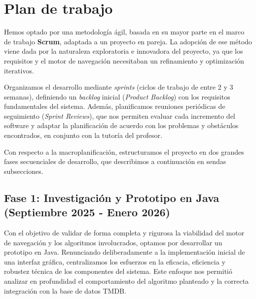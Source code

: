 \section{Plan de trabajo}
Hemos optado por una metodología ágil, basada en su mayor parte en el marco de trabajo \textbf{Scrum}, adaptada a un 
proyecto en pareja. La adopción de ese método viene dada por la naturaleza exploratoria e innovadora del proyecto,
ya que los requisitos y el motor de navegación necesitaban un refinamiento y optimización iterativos.

Organizamos el desarrollo mediante \textit{sprints} (ciclos de trabajo de entre 2 y 3 semanas), definiendo un
\textit{backlog} inicial (\textit{Product Backlog}) con los requisitos fundamentales del sistema. Además, planificamos reuniones
periódicas de seguimiento (\textit{Sprint Reviews}), que nos permiten evaluar cada incremento del software y adaptar la
planificación de acuerdo con los problemas y obstáculos encontrados, en conjunto con la tutoría del profesor.

Con respecto a la macroplanificación, estructuramos el proyecto en dos grandes fases secuenciales de desarrollo,
que describimos a continuación en sendas subsecciones.

\subsection{Fase 1: Investigación y Prototipo en Java (Septiembre 2025 - Enero 2026)}
Con el objetivo de validar de forma completa y rigurosa la viabilidad del motor de navegación y los algoritmos involucrados,
optamos por desarrollar un prototipo en Java. Renunciando deliberadamente a la implementación inicial de una interfaz gráfica,
centralizamos los esfuerzos en la eficacia, eficiencia y robustez técnica de los componentes del sistema.
Este enfoque nos permitió analizar en profundidad el comportamiento del algoritmo planteado y la correcta integración
con la base de datos TMDB.

